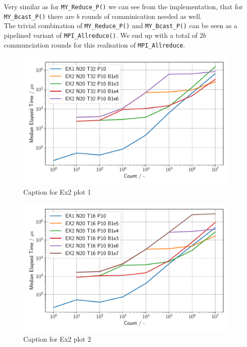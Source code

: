 Very similar as for \texttt{MY\_Reduce\_P()} we can see from the implementation, that for \texttt{MY\_Bcast\_P()} 
there are $b$ rounds of comminication needed as well.\\

The trivial combination of \texttt{MY\_Reduce\_P()} and \texttt{MY\_Bcast\_P()} can be seen as a pipelined variant 
of \texttt{MPI\_Allreduce()}. We end up with a total of $2b$ communciation rounds for this realisation of 
\texttt{MPI\_Allreduce}.\\

\begin{figure}[h]
    \begin{center}
        \includegraphics[width=1.0\linewidth]{figures/Ex2_1.pdf}
        \caption{Caption for Ex2 plot 1}
        \label{Ex2_1_p}
    \end{center}
\end{figure}

\begin{figure}[h]
    \begin{center}
        \includegraphics[width=1.0\linewidth]{figures/Ex2_2.pdf}
        \caption{Caption for Ex2 plot 2}
        \label{Ex2_2_p}
    \end{center}
\end{figure}

